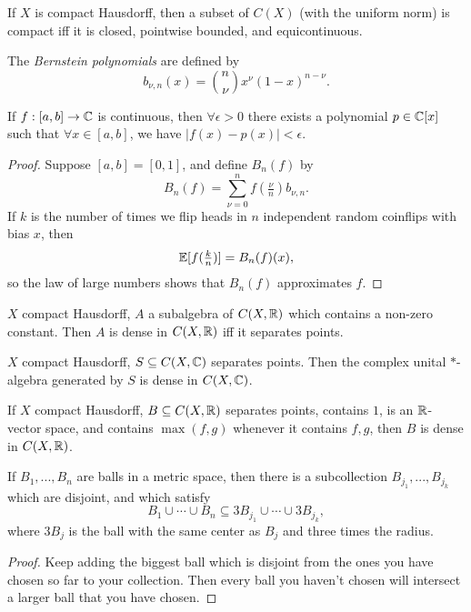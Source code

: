 \documentclass[letterpaper,11pt]{report}
\begin{document}
\begin{thm} If $X$ is compact Hausdorff, then a subset of $C(X)$ (with the uniform norm) is compact iff it is closed, pointwise bounded, and equicontinuous.
\end{thm}

\begin{defn} The \emph{Bernstein polynomials} are defined by
\[
b_{\nu,n}(x) = \binom{n}{\nu} x^\nu (1-x)^{n-\nu}.
\]
\end{defn}

\begin{thm} If $f:[a,b]\rightarrow \mathbb{C}$ is continuous, then $\forall \epsilon > 0$ there exists a polynomial $p \in \mathbb{C}[x]$ such that $\forall x \in [a,b]$, we have $|f(x) - p(x)| < \epsilon$.
\end{thm}
\begin{proof} Suppose $[a,b] = [0,1]$, and define $B_n(f)$ by
\[
B_n(f) = \sum_{\nu = 0}^n f(\tfrac{\nu}{n})b_{\nu,n}.
\]
If $k$ is the number of times we flip heads in $n$ independent random coinflips with bias $x$, then
\[
\mathbb{E}[f(\tfrac{k}{n})] = B_n(f)(x),
\]
so the law of large numbers shows that $B_n(f)$ approximates $f$.
\end{proof}

\begin{thm} $X$ compact Hausdorff, $A$ a subalgebra of $C(X,\mathbb{R})$ which contains a non-zero constant. Then $A$ is dense in $C(X,\mathbb{R})$ iff it separates points.
\end{thm}

\begin{thm} $X$ compact Hausdorff, $S \subseteq C(X,\mathbb{C})$ separates points. Then the complex unital $*$-algebra generated by $S$ is dense in $C(X,\mathbb{C})$.
\end{thm}

\begin{thm} If $X$ compact Hausdorff, $B \subseteq C(X,\mathbb{R})$ separates points, contains $1$, is an $\mathbb{R}$-vector space, and contains $\max(f,g)$ whenever it contains $f,g$, then $B$ is dense in $C(X,\mathbb{R})$.
\end{thm}

\begin{lem} If $B_1, ..., B_n$ are balls in a metric space, then there is a subcollection $B_{j_1}, ..., B_{j_k}$ which are disjoint, and which satisfy
\[
B_1 \cup \cdots \cup B_n \subseteq 3B_{j_1} \cup \cdots \cup 3B_{j_k},
\]
where $3B_j$ is the ball with the same center as $B_j$ and three times the radius.
\end{lem}
\begin{proof} Keep adding the biggest ball which is disjoint from the ones you have chosen so far to your collection. Then every ball you haven't chosen will intersect a larger ball that you have chosen.
\end{proof}
\end{document}

